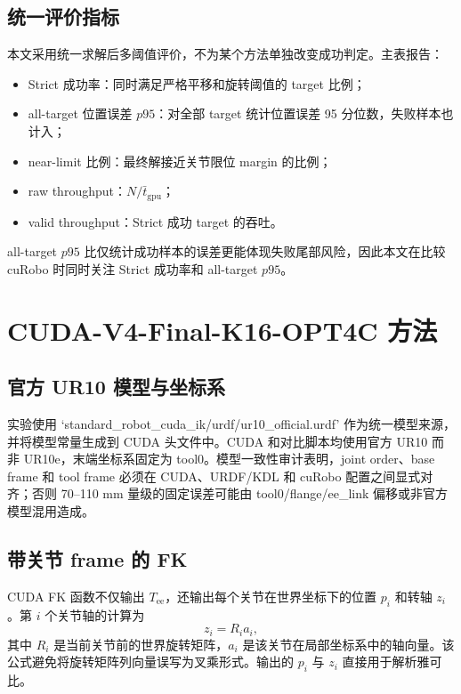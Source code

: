 \documentclass[twocolumn,a4paper,10pt]{ctexart}
\begin{document}
\subsection{统一评价指标}

本文采用统一求解后多阈值评价，不为某个方法单独改变成功判定。主表报告：
\begin{itemize}
  \item Strict 成功率：同时满足严格平移和旋转阈值的 target 比例；
  \item all-target 位置误差 $p95$：对全部 target 统计位置误差 95 分位数，失败样本也计入；
  \item near-limit 比例：最终解接近关节限位 margin 的比例；
  \item raw throughput：$N/\bar{t}_{\mathrm{gpu}}$；
  \item valid throughput：Strict 成功 target 的吞吐。
\end{itemize}
all-target $p95$ 比仅统计成功样本的误差更能体现失败尾部风险，因此本文在比较 cuRobo 时同时关注 Strict 成功率和 all-target $p95$。

\section{CUDA-V4-Final-K16-OPT4C 方法}

\subsection{官方 UR10 模型与坐标系}

实验使用 `standard\_robot\_cuda\_ik/urdf/ur10\_official.urdf' 作为统一模型来源，并将模型常量生成到 CUDA 头文件中。CUDA 和对比脚本均使用官方 UR10 而非 UR10e，末端坐标系固定为 tool0。模型一致性审计表明，joint order、base frame 和 tool frame 必须在 CUDA、URDF/KDL 和 cuRobo 配置之间显式对齐；否则 70--110 mm 量级的固定误差可能由 tool0/flange/ee\_link 偏移或非官方模型混用造成。

\subsection{带关节 frame 的 FK}

CUDA FK 函数不仅输出 $T_{\mathrm{ee}}$，还输出每个关节在世界坐标下的位置 $p_i$ 和转轴 $z_i$。第 $i$ 个关节轴的计算为
\begin{equation}
z_i=R_i a_i,
\end{equation}
其中 $R_i$ 是当前关节前的世界旋转矩阵，$a_i$ 是该关节在局部坐标系中的轴向量。该公式避免将旋转矩阵列向量误写为叉乘形式。输出的 $p_i$ 与 $z_i$ 直接用于解析雅可比。
\end{document}
